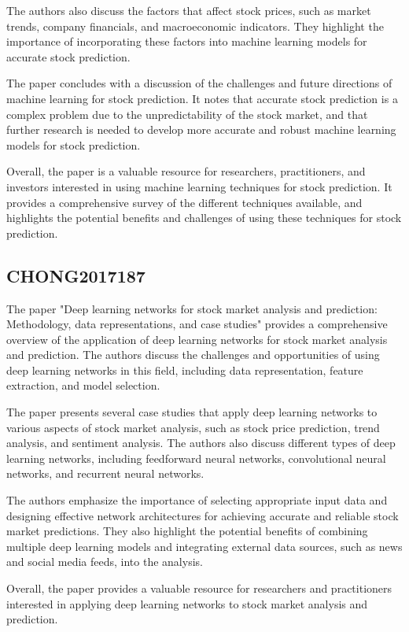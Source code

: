 \documentclass{article}
\begin{document}
The authors also discuss the factors that affect stock prices, such as market trends, company financials, and macroeconomic indicators. They highlight the importance of incorporating these factors into machine learning models for accurate stock prediction.

The paper concludes with a discussion of the challenges and future directions of machine learning for stock prediction. It notes that accurate stock prediction is a complex problem due to the unpredictability of the stock market, and that further research is needed to develop more accurate and robust machine learning models for stock prediction.

Overall, the paper is a valuable resource for researchers, practitioners, and investors interested in using machine learning techniques for stock prediction. It provides a comprehensive survey of the different techniques available, and highlights the potential benefits and challenges of using these techniques for stock prediction.



\subsection{CHONG2017187}
The paper "Deep learning networks for stock market analysis and prediction: Methodology, data representations, and case studies" provides a comprehensive overview of the application of deep learning networks for stock market analysis and prediction. The authors discuss the challenges and opportunities of using deep learning networks in this field, including data representation, feature extraction, and model selection.

The paper presents several case studies that apply deep learning networks to various aspects of stock market analysis, such as stock price prediction, trend analysis, and sentiment analysis. The authors also discuss different types of deep learning networks, including feedforward neural networks, convolutional neural networks, and recurrent neural networks.

The authors emphasize the importance of selecting appropriate input data and designing effective network architectures for achieving accurate and reliable stock market predictions. They also highlight the potential benefits of combining multiple deep learning models and integrating external data sources, such as news and social media feeds, into the analysis.

Overall, the paper provides a valuable resource for researchers and practitioners interested in applying deep learning networks to stock market analysis and prediction.
\end{document}
